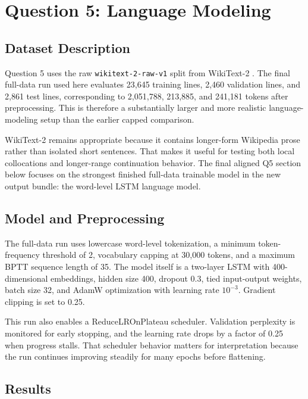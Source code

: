 \section{Question 5: Language Modeling}

\subsection{Dataset Description}

Question 5 uses the raw \nolinkurl{wikitext-2-raw-v1} split from WikiText-2 \cite{merity2016wikitext}. The final full-data run used here evaluates 23{,}645 training lines, 2{,}460 validation lines, and 2{,}861 test lines, corresponding to 2{,}051{,}788, 213{,}885, and 241{,}181 tokens after preprocessing. This is therefore a substantially larger and more realistic language-modeling setup than the earlier capped comparison.

WikiText-2 remains appropriate because it contains longer-form Wikipedia prose rather than isolated short sentences. That makes it useful for testing both local collocations and longer-range continuation behavior. The final aligned Q5 section below focuses on the strongest finished full-data trainable model in the new output bundle: the word-level LSTM language model.

\subsection{Model and Preprocessing}

The full-data run uses lowercase word-level tokenization, a minimum token-frequency threshold of 2, vocabulary capping at 30{,}000 tokens, and a maximum BPTT sequence length of 35. The model itself is a two-layer LSTM \cite{hochreiter1997lstm} with 400-dimensional embeddings, hidden size 400, dropout 0.3, tied input-output weights, batch size 32, and AdamW optimization with learning rate \(10^{-3}\). Gradient clipping is set to 0.25.

This run also enables a ReduceLROnPlateau scheduler. Validation perplexity is monitored for early stopping, and the learning rate drops by a factor of 0.25 when progress stalls. That scheduler behavior matters for interpretation because the run continues improving steadily for many epochs before flattening.

\subsection{Results}

